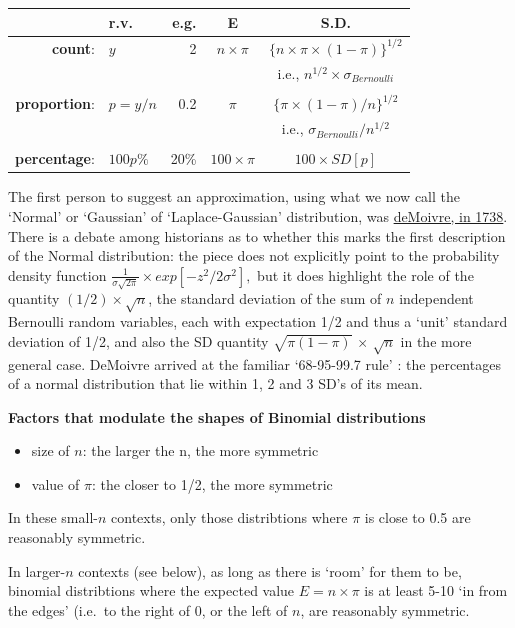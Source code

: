 \documentclass[]{book}
\begin{document}
\begin{longtable}[]{@{}rlrcc@{}}
\toprule
& r.v. & e.g. & E & S.D.\tabularnewline
\midrule
\endhead
\textbf{count}: & \(y\) & 2 & \(n \times \pi\) & \(\{n \times \pi \times (1-\pi) \}^{1/2}\)\tabularnewline
& & & & i.e., \(n^{1/2} \times \sigma_{Bernoulli}\)\tabularnewline
& & & &\tabularnewline
\textbf{proportion}: & \(p=y/n\) & 0.2 & \(\pi\) & \(\{\pi \times (1-\pi) / n \}^{1/2}\)\tabularnewline
& & & & i.e., \(\sigma_{Bernoulli} / n^{1/2}\)\tabularnewline
& & & &\tabularnewline
\textbf{percentage}: & \(100p\%\) & 20\% & \(100 \times \pi\) & \(100 \times SD[p]\)\tabularnewline
\bottomrule
\end{longtable}

The first person to suggest an approximation, using what we now call the `Normal' or `Gaussian' of `Laplace-Gaussian' distribution, was
\href{http://www.biostat.mcgill.ca/hanley/statbook/TheDoctrineOfChancesAnnotated.pdf}{deMoivre, in 1738}. There is a debate among historians as to whether this marks the first description of the Normal distribution: the piece does not explicitly point to the probability density function \(\frac{1}{\sigma \sqrt{2 \pi}} \times exp[-z^2/2\sigma^2],\) but it does highlight the role of the quantity \((1/2) \times \sqrt{n}\), the standard deviation of the sum of \(n\) independent Bernoulli random variables, each with expectation 1/2 and thus a `unit' standard deviation of 1/2, and also the SD quantity \(\sqrt{\pi(1-\pi)}\) \(\times\) \(\sqrt{n}\) in the more general case. DeMoivre arrived at the familiar `68-95-99.7 rule' : the percentages of a normal distribution that lie within 1, 2 and 3 SD's of its mean.

\textbf{Factors that modulate the shapes of Binomial distributions}

\begin{itemize}
\item
  size of \(n\): the larger the n, the more symmetric
\item
  value of \(\pi\): the closer to 1/2, the more symmetric
\end{itemize}

In these small-\(n\) contexts, only those distribtions where \(\pi\) is close to 0.5 are reasonably symmetric.

In larger-\(n\) contexts (see below), as long as there is `room' for them to be, binomial distribtions where the expected value \(E = n \times \pi\) is at least 5-10 `in from the edges' (i.e.~to the right of 0, or the left of \(n\), are reasonably symmetric.
\end{document}
